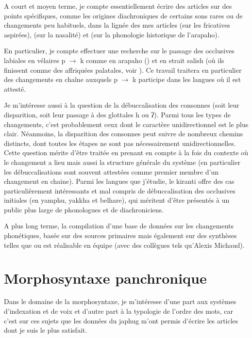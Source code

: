 \documentclass[oldfontcommands,oneside,a4paper,11pt]{article}
\newcommand{\ipa}[1]{{\phon #1}} %
\begin{document}
A court et moyen terme, je compte essentiellement écrire des articles sur des points spécifiques, comme les origines diachroniques de certains sons rares ou de changements peu habituels, dans la lignée des mes articles \citet{jacques11lingua} (sur les fricatives aspirées), \citet{michaud-jacques12nasalite} (sur la nasalité) et \citet{jacques13arapaho} (sur la phonologie historique de l'arapaho). 

En particulier, je compte effectuer une recherche sur le passage des occlusives labiales en vélaires \ipa{*p} $\rightarrow$ \ipa{k}  comme en arapaho (\citealt{goddard74arapaho}) et en strait salish (où ils finissent comme des affriquées palatales, voir \citealt[10-11]{kuipers02salish}). Ce travail traitera en particulier des changements en chaîne auxquels \ipa{*p} $\rightarrow$ \ipa{k}  participe dans les langues où il est attesté.

Je m'intéresse aussi à la question de la débuccalisation des consonnes (soit leur disparition, soit leur passage à des glottales \ipa{h} ou \ipa{ʔ}). Parmi tous les types de changements, c'est probablement ceux dont le caractère unidirectionnel est le plus clair. Néanmoins, la disparition des consonnes peut suivre de nombreux chemins distincts, dont toutes les étapes ne sont pas nécessairement unidirectionnelles. Cette question mérite d'être traitée en prenant en compte à la fois du contexte où le changement a lieu mais aussi la structure générale du système (en particulier les débuccalisations sont souvent attestées comme premier membre d'un changement en chaine). Parmi les langues que j'étudie, le kiranti offre des cas particulièrement intéressants et mal compris de débuccalisation des occlusives initiales (en yamphu, yakkha et belhare), qui méritent d'être présentés à un public plus large de phonologues et de diachroniciens.


A plus long terme, la compilation d'une base de données sur les changements phonétiques, basée sur des sources primaires mais également sur des synthèses telles que  \citet{kuemmel07wandel} ou \citet{blevins04evolutionary, blevins08naturalness} est réalisable en équipe (avec des collègues tels qu'Alexis Michaud).

 

\section{Morphosyntaxe panchronique}
Dans le domaine de la morphosyntaxe, je m'intéresse d'une part aux systèmes d'indexation et de voix et d'autre part à la typologie de l'ordre des mots, car c'est sur ces sujets que les données du japhug m'ont permis d'écrire les articles dont je suis le plus satisfait.
\end{document}
